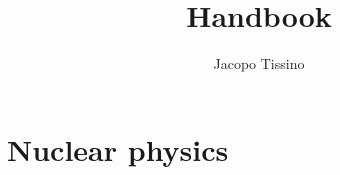 \documentclass[a4paper, 12pt]{report}
\title{Handbook}
\author{Jacopo Tissino}
\begin{document}
\maketitle

%
% 

\chapter{Nuclear physics}


\end{document}
